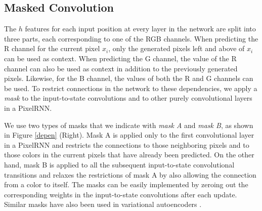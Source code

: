 \subsection{Masked Convolution}
\label{sect:masked}

The $h$ features for each input position at every layer in the network are split into three parts, each corresponding to one of the RGB channels. When predicting the R channel for the current pixel $x_i$, only the generated pixels left and above of $x_i$ can be used as context. When predicting the G channel, the value of the R channel can also be used as context in addition to the previously generated pixels. Likewise, for the B channel, the values of both the R and G channels can be used. To restrict connections in the network to these dependencies, we apply a \emph{mask} to the input-to-state convolutions and to other purely convolutional layers in a PixelRNN. 

We use two types of masks that we indicate with \emph{mask A} and \emph{mask B}, as shown in Figure \ref{depen} (Right). Mask A is applied only to the first convolutional layer in a PixelRNN and restricts the connections to those neighboring pixels and to those colors in the current pixels that have already been predicted. On the other hand, mask B is applied to all the subsequent input-to-state convolutional transitions and relaxes the restrictions of mask A by also allowing the connection from a color to itself. The masks can be easily implemented by zeroing out the corresponding weights in the input-to-state convolutions after each update. Similar masks have also been used in variational autoencoders \cite{gregor2013deep, germain2015made}.

